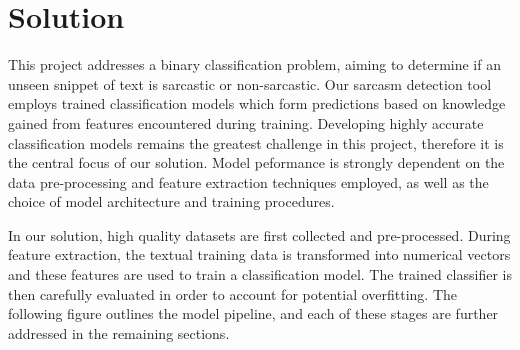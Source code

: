 \documentclass[12pt,a4paper]{article}
\begin{document}





\section{Solution}
\noindent This project addresses a binary classification problem, aiming to determine if an unseen snippet of text is sarcastic or non-sarcastic. Our sarcasm detection tool employs trained classification models which form  predictions based on knowledge gained from features encountered during training. Developing highly accurate classification models remains the greatest challenge in this project, therefore it is the central focus of our solution. Model peformance is strongly dependent on the data pre-processing and feature extraction techniques employed, as well as the choice of model architecture and training procedures. 

In our solution, high quality datasets are first collected and pre-processed. During feature extraction, the textual training data is transformed into numerical vectors and these features are used to train a classification model. The trained classifier is then carefully evaluated in order to account for potential overfitting. The following figure outlines the model pipeline, and each of these stages are further addressed in the remaining sections.
\end{document}
